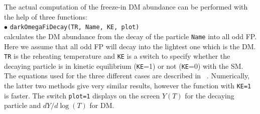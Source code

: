 \documentclass[12pt,a4paper]{article}
\begin{document}
The actual computation of the freeze-in DM abundance can be performed with the help of three functions:\\
\noindent
$\bullet$ \verb|darkOmegaFiDecay(TR, Name, KE, plot) | \\
calculates the  DM abundance from the  decay of the particle \verb|Name| into all odd FP. Here we assume that all odd FP will decay into the lightest one which is the DM. \verb|TR| is the  reheating temperature and \verb|KE| is a switch to specify whether the decaying particle is in kinetic equilibrium (\verb|KE|=1) or not (\verb|KE|=0) with the SM.
The equations used for the three different cases are described in ~\cite{Belanger:2018ccd}.
 Numerically, the latter two methods give very similar results, however the function with \verb|KE=1| is faster. The switch \verb|plot=1| displays on the screen  $Y(T)$ for the decaying particle and $dY/d\log(T)$ for DM.\\
\end{document}
